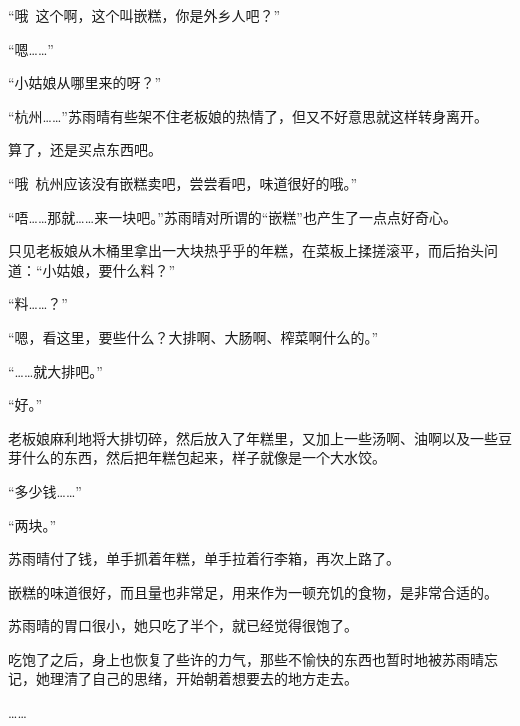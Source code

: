 “哦~这个啊，这个叫嵌糕，你是外乡人吧？”

“嗯……”

“小姑娘从哪里来的呀？”

“杭州……”苏雨晴有些架不住老板娘的热情了，但又不好意思就这样转身离开。

算了，还是买点东西吧。

“哦~杭州应该没有嵌糕卖吧，尝尝看吧，味道很好的哦。”

“唔……那就……来一块吧。”苏雨晴对所谓的“嵌糕”也产生了一点点好奇心。

只见老板娘从木桶里拿出一大块热乎乎的年糕，在菜板上揉搓滚平，而后抬头问道：“小姑娘，要什么料？”

“料……？”

“嗯，看这里，要些什么？大排啊、大肠啊、榨菜啊什么的。”

“……就大排吧。”

“好。”

老板娘麻利地将大排切碎，然后放入了年糕里，又加上一些汤啊、油啊以及一些豆芽什么的东西，然后把年糕包起来，样子就像是一个大水饺。

“多少钱……”

“两块。”

苏雨晴付了钱，单手抓着年糕，单手拉着行李箱，再次上路了。

嵌糕的味道很好，而且量也非常足，用来作为一顿充饥的食物，是非常合适的。

苏雨晴的胃口很小，她只吃了半个，就已经觉得很饱了。

吃饱了之后，身上也恢复了些许的力气，那些不愉快的东西也暂时地被苏雨晴忘记，她理清了自己的思绪，开始朝着想要去的地方走去。

……
